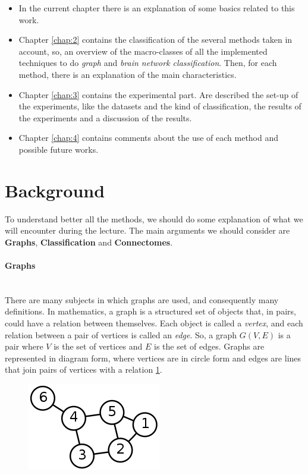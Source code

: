 \begin{itemize}
	\item In the current chapter there is an explanation of some basics related to this work.
	\item Chapter \ref{chap:2} contains the classification of the several methods taken in account, so, an overview of the macro-classes of all the implemented techniques to do \emph{graph} and \emph{brain network classification}. 
	Then, for each method, there is an explanation of the main characteristics.
	\item Chapter \ref{chap:3} contains the experimental part. Are described the set-up of the experiments, like the datasets and the kind of classification, the results of the experiments and a discussion of the results.
	\item Chapter \ref{chap:4} contains comments about the use of each method and possible future works. 
\end{itemize}

\section{Background}
To understand better all the methods, we should do some explanation of what we will encounter during the lecture. The main arguments we should consider are \textbf{Graphs}, \textbf{Classification} and \textbf{Connectomes}.

\paragraph{Graphs} \
\\
There are many subjects in which graphs are used, and consequently many definitions. In mathematics, a graph is a structured set of objects that, in pairs, could have a relation between themselves. Each object is called a \textit{vertex}, and each relation between a pair of vertices is called an \textit{edge}. So, a graph $ G(V,E) $ is a pair where $ V $ is the set of vertices and $ E $ is the set of edges. Graphs are represented in diagram form, where vertices are in circle form and edges are lines that join pairs of vertices with a relation \ref{fig:diagram}.
\begin{figure}[htbp]
	\centering
	\includegraphics[scale=0.5]{Immagini/220px-6n-graf.svg.png}
	\caption{\label{fig:diagram}}
\end{figure}

